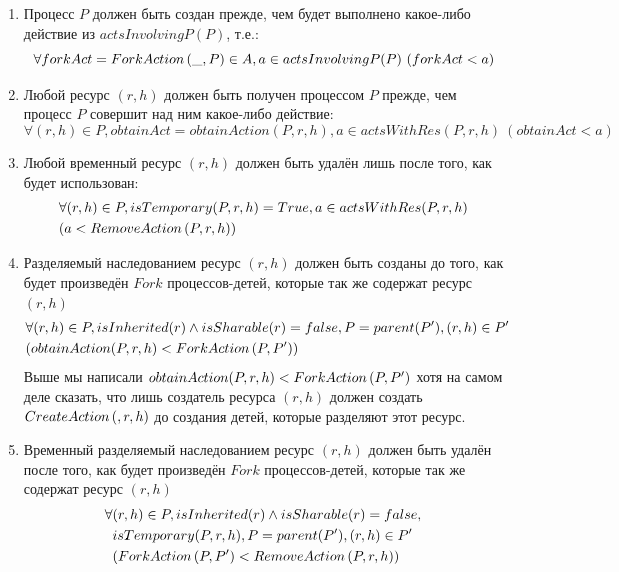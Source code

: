 \begin{enumerate}
	\item \label{chap2:preced:a} Процесс $P$ должен быть создан прежде, чем будет выполнено какое-либо действие из $actsInvolvingP(P)$, т.е.:
		\begin{equation*}
		     \forall forkAct = ForkAction\left( \_, P \right) \in A, a \in actsInvolvingP(P)\ (forkAct < a) 
		\end{equation*}

	\item \label{chap2:preced:b} Любой ресурс $(r, h)$ должен быть получен процессом $P$ прежде, чем процесс $P$ совершит над ним какое-либо действие:
		\begin{equation*}
			\forall (r, h) \in P, obtainAct = obtainAction(P, r, h), a \in actsWithRes(P, r, h)\ (obtainAct < a)
		\end{equation*}

	\item \label{chap2:preced:c} Любой временный ресурс $(r, h)$ должен быть удалён лишь после того, как будет использован:
		\begin{align*}
			&\forall (r, h) \in P, isTemporary(P, r, h) = True, a \in actsWithRes(P, r, h)\\ 
			&(a < RemoveAction\left( P, r, h \right))
		\end{align*}

	\item \label{chap2:preced:d} Разделяемый наследованием ресурс $(r, h)$ должен быть созданы до того, как будет произведён $Fork$ процессов-детей, которые так же содержат ресурс $(r, h)$
		\begin{align*}
			&\forall (r, h) \in P, isInherited(r) \land isSharable(r) = false, P = parent(P'), (r, h) \in P'\\
			&(obtainAction(P, r, h) < ForkAction\left( P, P' \right))
		\end{align*}
		Выше мы написали $obtainAction(P, r, h) < ForkAction\left( P, P' \right)$ хотя на самом деле сказать, что лишь создатель ресурса $(r, h)$ должен создать $CreateAction\left( , r, h \right)$ до создания детей, которые разделяют этот ресурс. 

	\item \label{chap2:preced:e} Временный разделяемый наследованием ресурс $(r, h)$ должен быть удалён после того, как будет произведён $Fork$ процессов-детей, которые так же содержат ресурс $(r, h)$
		\begin{align*}
			\forall & (r, h) \in P, isInherited(r) \land isSharable(r) = false, \\
			&isTemporary(P, r, h), P = parent(P'), (r, h) \in P'\\
			&(ForkAction\left( P, P' \right) < RemoveAction\left( P, r, h \right))
		\end{align*}


\end{enumerate}
